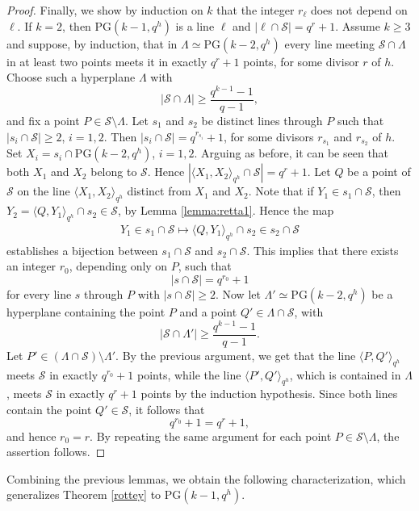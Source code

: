 \documentclass[11pt]{article}
\theoremstyle{definition}
\numberwithin{equation}{section}
\def\cS{\mathcal S}
\def\PG{\mathrm{PG}}
\begin{document}
\begin{proof}
Finally, we show by induction on $k$ that the integer $r_\ell$ does not depend on $\ell$.
If $k = 2$, then $\PG(k-1, q^h)$ is a line $\ell$ and $|\ell \cap \cS| = q^r+1$. Assume $k\ge 3$ and suppose, by induction, that in $\Lambda \simeq \PG(k-2,q^h)$ every line meeting
$\cS\cap \Lambda$ in at least two points meets it in exactly $q^{r}+1$ points, for some divisor $r$ of $h$.
Choose such a hyperplane $\Lambda$ with 
\[
|\cS\cap \Lambda|\ge \frac{q^{k-1}-1}{q-1},
\]
and fix a point $P\in \cS\setminus \Lambda$. Let $s_1$ and $s_2$ be distinct lines through $P$ such that $|s_i\cap \cS|\ge 2$, $i=1,2$. Then $|s_i \cap \cS| = q^{r_{s_i}} + 1$, for some divisors $r_{s_1}$ and $r_{s_2}$ of $h$. Set $X_i = s_i \cap \PG(k-2, q^h)$, $i = 1, 2$. Arguing as before, it can be seen that both $X_1$ and $X_2$ belong to $\cS$. Hence $\left|\langle X_1, X_2 \rangle_{q^h} \cap \cS\right| = q^r+1$. Let $Q$ be a point of $\cS$ on the line $\langle X_1, X_2 \rangle_{q^h}$ distinct from $X_1$ and $X_2$. Note that if $Y_1 \in s_1 \cap \cS$, then $Y_2 = \langle Q, Y_1 \rangle_{q^h} \cap s_2 \in \cS$, by Lemma \ref{lemma:retta1}. Hence the map 
\begin{align*}
Y_1 \in s_1 \cap \cS \mapsto \langle Q, Y_1 \rangle_{q^h} \cap s_2 \in s_2 \cap \cS    
\end{align*}
establishes a bijection between $s_1 \cap \cS$ and $s_2 \cap \cS$. This implies that there exists an integer $r_0$,
depending only on $P$, such that
\[
|s\cap \mathcal S| = q^{r_0}+1
\]
for every line $s$ through $P$ with $|s\cap \mathcal S|\ge 2$. Now let $\Lambda' \simeq \PG(k-2,q^h)$ be a hyperplane containing the point
$P$ and a point $Q' \in \Lambda \cap \cS$, with
\[
|\cS \cap \Lambda' | \ge \frac{q^{k-1}-1}{q-1}.
\] Let $P' \in (\Lambda \cap \cS) \setminus \Lambda'$.
By the previous argument, we get that the line $\langle P,Q'\rangle_{q^h}$ meets $\mathcal S$ in exactly
$q^{r_0}+1$ points, while the line $\langle P',Q'\rangle_{q^h}$, which is
contained in $\Lambda$, meets $\mathcal S$ in exactly $q^{r}+1$ points by the
induction hypothesis. Since both lines contain the point $Q' \in \mathcal S$,
it follows that
\[
q^{r_0}+1 = q^{r}+1,
\]
and hence $r_0 = r$. By repeating the same argument for each point $P \in \mathcal S \setminus \Lambda$, the assertion follows.
\end{proof}



Combining the previous lemmas, we obtain the following characterization,
which generalizes Theorem \ref{rottey} to $\PG(k-1,q^h)$.
\end{document}
